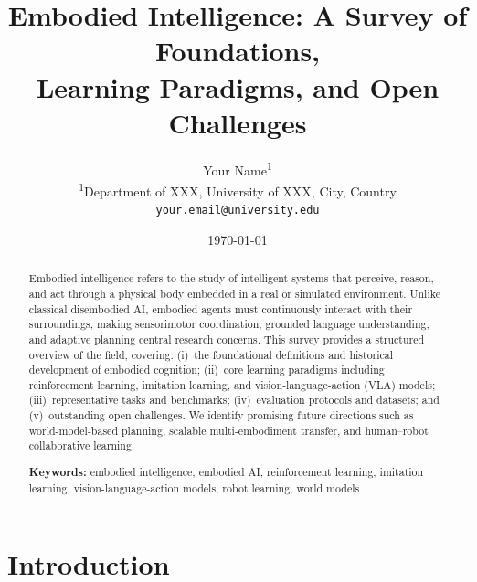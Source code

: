 \documentclass[12pt, a4paper]{article}
\begin{document}
\title{\textbf{Embodied Intelligence: A Survey of Foundations,\\
               Learning Paradigms, and Open Challenges}}

\author{
  Your Name\textsuperscript{1}
  \\[4pt]
  \small\textsuperscript{1}Department of XXX, University of XXX, City, Country\\
  \small\texttt{your.email@university.edu}
}

\date{\today}
\maketitle

\begin{abstract}
Embodied intelligence refers to the study of intelligent systems
that perceive, reason, and act through a physical body embedded
in a real or simulated environment.
Unlike classical disembodied AI, embodied agents must
continuously interact with their surroundings, making
sensorimotor coordination, grounded language understanding,
and adaptive planning central research concerns.
This survey provides a structured overview of the field,
covering: (i)~the foundational definitions and historical
development of embodied cognition; (ii)~core learning
paradigms including reinforcement learning, imitation learning,
and vision-language-action (VLA) models; (iii)~representative
tasks and benchmarks; (iv)~evaluation protocols and datasets;
and (v)~outstanding open challenges.
We identify promising future directions such as world-model-based
planning, scalable multi-embodiment transfer, and
human–robot collaborative learning.


\noindent\textbf{Keywords:} embodied intelligence, embodied AI,
reinforcement learning, imitation learning,
vision-language-action models, robot learning, world models
\end{abstract}

\section{Introduction}
\label{sec:intro}
\end{document}
